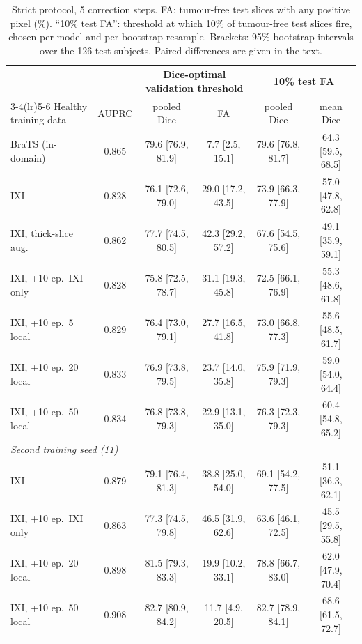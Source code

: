\begin{table}[t]
\centering\small
\setlength{\tabcolsep}{4pt}
\caption{Strict protocol, 5 correction steps. FA: tumour-free test slices with any positive pixel (\%). ``10\% test FA'': threshold at which 10\% of tumour-free test slices fire, chosen per model and per bootstrap resample. Brackets: 95\% bootstrap intervals over the 126 test subjects. Paired differences are given in the text.}
\label{tab:site}
\begin{tabular}{lccccc}
\toprule
& & \multicolumn{2}{c}{Dice-optimal validation threshold} & \multicolumn{2}{c}{10\% test FA} \\
\cmidrule(lr){3-4}\cmidrule(lr){5-6}
Healthy training data & AUPRC & pooled Dice & FA & pooled Dice & mean Dice \\
\midrule
BraTS (in-domain) & 0.865 & 79.6 [76.9, 81.9] & 7.7 [2.5, 15.1] & 79.6 [76.8, 81.7] & 64.3 [59.5, 68.5] \\
IXI & 0.828 & 76.1 [72.6, 79.0] & 29.0 [17.2, 43.5] & 73.9 [66.3, 77.9] & 57.0 [47.8, 62.8] \\
IXI, thick-slice aug. & 0.862 & 77.7 [74.5, 80.5] & 42.3 [29.2, 57.2] & 67.6 [54.5, 75.6] & 49.1 [35.9, 59.1] \\
IXI, +10 ep.\ IXI only & 0.828 & 75.8 [72.5, 78.7] & 31.1 [19.3, 45.8] & 72.5 [66.1, 76.9] & 55.3 [48.6, 61.8] \\
IXI, +10 ep.\ 5 local & 0.829 & 76.4 [73.0, 79.1] & 27.7 [16.5, 41.8] & 73.0 [66.8, 77.3] & 55.6 [48.5, 61.7] \\
IXI, +10 ep.\ 20 local & 0.833 & 76.9 [73.8, 79.5] & 23.7 [14.0, 35.8] & 75.9 [71.9, 79.3] & 59.0 [54.0, 64.4] \\
IXI, +10 ep.\ 50 local & 0.834 & 76.8 [73.8, 79.3] & 22.9 [13.1, 35.0] & 76.3 [72.3, 79.3] & 60.4 [54.8, 65.2] \\
\midrule
\multicolumn{6}{l}{\emph{Second training seed (11)}} \\
IXI & 0.879 & 79.1 [76.4, 81.3] & 38.8 [25.0, 54.0] & 69.1 [54.2, 77.5] & 51.1 [36.3, 62.1] \\
IXI, +10 ep.\ IXI only & 0.863 & 77.3 [74.5, 79.8] & 46.5 [31.9, 62.6] & 63.6 [46.1, 72.5] & 45.5 [29.5, 55.8] \\
IXI, +10 ep.\ 20 local & 0.898 & 81.5 [79.3, 83.3] & 19.9 [10.2, 33.1] & 78.8 [66.7, 83.0] & 62.0 [47.9, 70.4] \\
IXI, +10 ep.\ 50 local & 0.908 & 82.7 [80.9, 84.2] & 11.7 [4.9, 20.5] & 82.7 [78.9, 84.1] & 68.6 [61.5, 72.7] \\
\bottomrule
\end{tabular}
\end{table}

